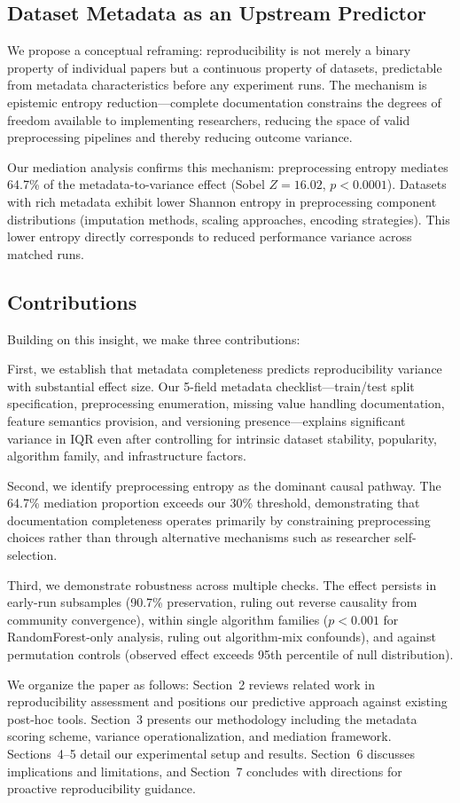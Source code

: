 \subsection{Dataset Metadata as an Upstream Predictor}

We propose a conceptual reframing: reproducibility is not merely a binary property of individual papers but a continuous property of datasets, predictable from metadata characteristics before any experiment runs. The mechanism is epistemic entropy reduction---complete documentation constrains the degrees of freedom available to implementing researchers, reducing the space of valid preprocessing pipelines and thereby reducing outcome variance.

Our mediation analysis confirms this mechanism: preprocessing entropy mediates 64.7\% of the metadata-to-variance effect (Sobel $Z = 16.02$, $p < 0.0001$). Datasets with rich metadata exhibit lower Shannon entropy in preprocessing component distributions (imputation methods, scaling approaches, encoding strategies). This lower entropy directly corresponds to reduced performance variance across matched runs.

\subsection{Contributions}

Building on this insight, we make three contributions:

First, we establish that metadata completeness predicts reproducibility variance with substantial effect size. Our 5-field metadata checklist---train/test split specification, preprocessing enumeration, missing value handling documentation, feature semantics provision, and versioning presence---explains significant variance in IQR even after controlling for intrinsic dataset stability, popularity, algorithm family, and infrastructure factors.

Second, we identify preprocessing entropy as the dominant causal pathway. The 64.7\% mediation proportion exceeds our 30\% threshold, demonstrating that documentation completeness operates primarily by constraining preprocessing choices rather than through alternative mechanisms such as researcher self-selection.

Third, we demonstrate robustness across multiple checks. The effect persists in early-run subsamples (90.7\% preservation, ruling out reverse causality from community convergence), within single algorithm families ($p < 0.001$ for RandomForest-only analysis, ruling out algorithm-mix confounds), and against permutation controls (observed effect exceeds 95th percentile of null distribution).

We organize the paper as follows: Section~2 reviews related work in reproducibility assessment and positions our predictive approach against existing post-hoc tools. Section~3 presents our methodology including the metadata scoring scheme, variance operationalization, and mediation framework. Sections~4--5 detail our experimental setup and results. Section~6 discusses implications and limitations, and Section~7 concludes with directions for proactive reproducibility guidance.
